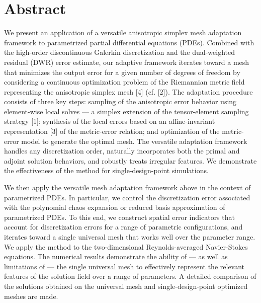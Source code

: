 \documentclass[article, A4, 11pt]{llncs}%
\begin{document}
\section*{Abstract}
We present an application of a versatile anisotropic simplex mesh adaptation framework to parametrized partial differential equations (PDEs). Combined with the high-order discontinuous Galerkin discretization and the dual-weighted residual (DWR) error estimate, our adaptive framework iterates toward a mesh that minimizes the output error for a given number of degrees of freedom by considering a continuous optimization problem of the Riemannian metric field representing the anisotropic simplex mesh [4] (cf. [2]). The adaptation procedure consists of three key steps: sampling of the anisotropic error behavior using element-wise local solves --- a simplex extension of the tensor-element sampling strategy [1]; synthesis of the local errors based on an affine-invariant representation [3] of the metric-error relation; and optimization of the  metric-error model to generate the optimal mesh. The versatile adaptation framework handles any discretization order, naturally incorporates both  the primal and adjoint solution behaviors, and robustly treats irregular features. We demonstrate the effectiveness of the method for single-design-point simulations.

We then apply the versatile mesh adaptation framework above in the context of parametrized PDEs. In particular, we control the discretization error associated with the polynomial chaos expansion or reduced basis approximation of parametrized PDEs. To this end, we construct spatial error indicators that account for discretization errors for a range of parametric configurations, and iterates toward a single universal mesh that works well over the parameter range. We apply the method to the two-dimensional Reynolds-averaged Navier-Stokes equations. The numerical results demonstrate the ability of --- as well as limitations of --- the single universal mesh to effectively represent the relevant features of the solution field over a range of parameters. A detailed comparison of the solutions obtained on the universal mesh and single-design-point optimized meshes are made.
\end{document}
